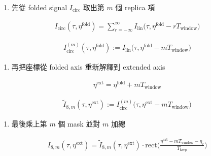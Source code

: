 \documentclass[10pt]{article}
\providecommand{\tightlist}{%
  \setlength{\itemsep}{0pt}\setlength{\parskip}{0pt}}
\begin{document}
\begin{enumerate}
\def\labelenumi{\arabic{enumi}.}
\tightlist
\item
  先從 folded signal \(I_{\mathrm{circ}}\) 取出第 \(m\) 個 replica 項
\end{enumerate}

\begin{equation}
\begin{aligned}
I_{\mathrm{circ}}(\tau,\eta^{\mathrm{fold}})=\sum_{r=-\infty}^{\infty}I_{\mathrm{lin}}\biggl(\tau,\eta^{\mathrm{fold}}-rT_{\mathrm{window}}\biggr)
\end{aligned}
\end{equation}

\begin{equation}
\begin{aligned}
I_{\mathrm{circ}}^{(m)}(\tau,\eta^{\mathrm{fold}}):=I_{\mathrm{lin}}\biggl(\tau,\eta^{\mathrm{fold}}-mT_{\mathrm{window}}\biggr)
\end{aligned}
\end{equation}

\begin{enumerate}
\def\labelenumi{\arabic{enumi}.}
\setcounter{enumi}{1}
\tightlist
\item
  再把座標從 folded axis 重新解釋到 extended axis
\end{enumerate}

\begin{equation}
\begin{aligned}
\eta^{\mathrm{ext}}=\eta^{\mathrm{fold}}+mT_{\mathrm{window}}
\end{aligned}
\end{equation}

\begin{equation}
\begin{aligned}
\widetilde I_{8,m}(\tau,\eta^{\mathrm{ext}}):=I_{\mathrm{circ}}^{(m)}\biggl(\tau,\eta^{\mathrm{ext}}-mT_{\mathrm{window}}\biggr)
\end{aligned}
\end{equation}

\begin{enumerate}
\def\labelenumi{\arabic{enumi}.}
\setcounter{enumi}{2}
\tightlist
\item
  最後乘上第 \(m\) 個 mask 並對 \(m\) 加總
\end{enumerate}

\begin{equation}
\begin{aligned}
I_{8,m}(\tau,\eta^{\mathrm{ext}})=\widetilde I_{8,m}(\tau,\eta^{\mathrm{ext}})\cdot
\mathrm{rect}\biggl(\frac{\eta^{\mathrm{ext}}-mT_{\mathrm{window}}-\eta_c}{T_{\mathrm{keep}}}\biggr)
\end{aligned}
\end{equation}
\end{document}
